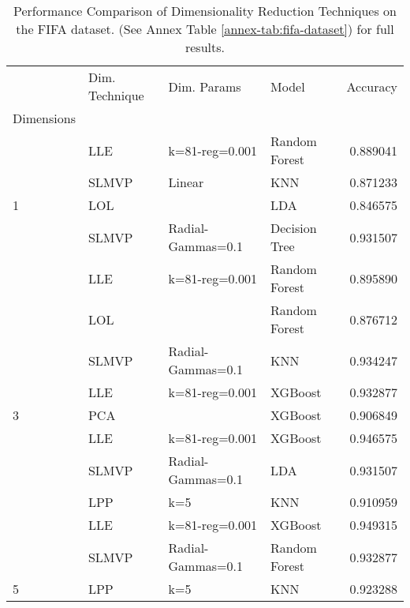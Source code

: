 \begin{table}[!h]
    \begin{tabular}{llllr}
        \toprule
        {}                                      & Dim. Technique & Dim. Params       & Model         & Accuracy \\
        Dimensions                              &                &                   &               &          \\
        \midrule
                                                & LLE            & k=81-reg=0.001    & Random Forest & 0.889041 \\
                                                & SLMVP          & Linear            & KNN           & 0.871233 \\
        \multirow{-3}{*}{1}                     & LOL            &                   & LDA           & 0.846575 \\
        \rowcolor{lightgray}                    & SLMVP          & Radial-Gammas=0.1 & Decision Tree & 0.931507 \\
        \rowcolor{lightgray}                    & LLE            & k=81-reg=0.001    & Random Forest & 0.895890 \\
        \rowcolor{lightgray}\multirow{-3}{*}{2} & LOL            &                   & Random Forest & 0.876712 \\
                                                & SLMVP          & Radial-Gammas=0.1 & KNN           & 0.934247 \\
                                                & LLE            & k=81-reg=0.001    & XGBoost       & 0.932877 \\
        \multirow{-3}{*}{3}                     & PCA            &                   & XGBoost       & 0.906849 \\
        \rowcolor{lightgray}                    & LLE            & k=81-reg=0.001    & XGBoost       & 0.946575 \\
        \rowcolor{lightgray}                    & SLMVP          & Radial-Gammas=0.1 & LDA           & 0.931507 \\
        \rowcolor{lightgray}\multirow{-3}{*}{4} & LPP            & k=5               & KNN           & 0.910959 \\
                                                & LLE            & k=81-reg=0.001    & XGBoost       & 0.949315 \\
                                                & SLMVP          & Radial-Gammas=0.1 & Random Forest & 0.932877 \\
        \multirow{-3}{*}{5}                     & LPP            & k=5               & KNN           & 0.923288 \\
        \bottomrule
    \end{tabular}
    \caption{Performance Comparison of Dimensionality Reduction Techniques on the FIFA dataset. (See Annex Table \ref{annex-tab:fifa-dataset}) for full results.}
    \label{tab:fifa-dataset}
\end{table}

